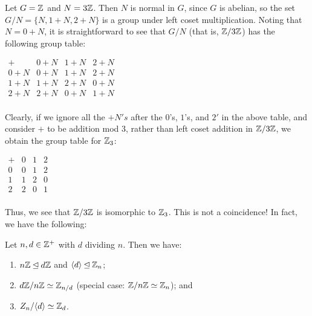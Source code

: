 \begin{example}{} Let $G=\mathbb{Z}$ and $N=3\mathbb{Z}$.  Then $N$ is normal in $G$, since $G$ is abelian, so the set
$G/N=\{N,1+N,2+N\}$ is a group under left coset multiplication.
 Noting that $N=0+N$, it is straightforward to see that
 $G/N$ (that is, $\mathbb{Z}/3\mathbb{Z}$) has the following group table:

\bigskip
\begin{center}
\renewcommand{\arraystretch}{1.3}
$\begin{array}{c||c|c|c} +&0+N&1+N&2+N\\ \hline\hline
0+N&0+N&1+N&2+N\\ \hline 1+N&1+N&2+N&0+N\\ \hline
2+N&2+N&0+N&1+N\\
\end{array}$
\end{center}
 Clearly, if we ignore all the $+N's$ after the $0$'s, $1$'s, and
$2'$ in the above table, and consider $+$ to be addition mod 3,
rather than left coset addition in $\mathbb{Z}/3\mathbb{Z}$, we obtain the group
table for $\mathbb{Z}_3$:
\end{example}

\bigskip\begin{center}
\renewcommand{\arraystretch}{1.3}
$\begin{array}{c||c|c|c} +&0&1&2\\ \hline\hline 0&0&1&2\\ \hline
1&1&2&0\\ \hline 2&2&0&1\\
\end{array}$\end{center}

 Thus, we see that $\mathbb{Z}/3\mathbb{Z}$ is isomorphic to $\mathbb{Z}_3$.
 This is not a coincidence!  In fact, we have the following:

\begin{thm}\label{} Let $n,d \in \mathbb{Z}^+$ with $d$ dividing $n$. Then we have:

\begin{enumerate}
\item $n\mathbb{Z}\unlhd d\mathbb{Z}$ and $\langle d\rangle\unlhd \mathbb{Z}_n$;

\item $d\mathbb{Z}/n\mathbb{Z}\simeq \mathbb{Z}_{n/d}$ (special case: $\mathbb{Z}/n\mathbb{Z} \simeq \mathbb{Z}_n$);
and

\item  $Z_n/\langle d\rangle \simeq \mathbb{Z}_d$.
\end{enumerate}
\end{thm}

